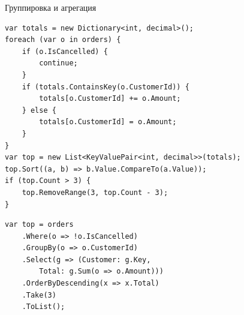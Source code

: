 \documentclass[aspectratio=169,10pt,t]{beamer}
\begin{document}
\begin{frame}[fragile]{Группировка и агрегация}
  \slidetop
  \begin{minipage}[t]{0.555\textwidth}
    \par\vspace{0.5em}
\begin{lstlisting}[style=csharp,basicstyle=\ttfamily\fontsize{6.6}{7.6}\selectfont]
var totals = new Dictionary<int, decimal>();
foreach (var o in orders) {
    if (o.IsCancelled) {
        continue;
    }
    if (totals.ContainsKey(o.CustomerId)) {
        totals[o.CustomerId] += o.Amount;
    } else {
        totals[o.CustomerId] = o.Amount;
    }
}
var top = new List<KeyValuePair<int, decimal>>(totals);
top.Sort((a, b) => b.Value.CompareTo(a.Value));
if (top.Count > 3) {
    top.RemoveRange(3, top.Count - 3);
}
\end{lstlisting}
  \end{minipage}\hfill
  \begin{minipage}[t]{0.42\textwidth}
    \par\vspace{0.5em}
\begin{lstlisting}[style=csharp,basicstyle=\ttfamily\scriptsize]
var top = orders
    .Where(o => !o.IsCancelled)
    .GroupBy(o => o.CustomerId)
    .Select(g => (Customer: g.Key,
        Total: g.Sum(o => o.Amount)))
    .OrderByDescending(x => x.Total)
    .Take(3)
    .ToList();
\end{lstlisting}
    \vspace{0.9em}
    \par
    \vspace{0.7em}
    \par
  \end{minipage}
\end{frame}
\end{document}
